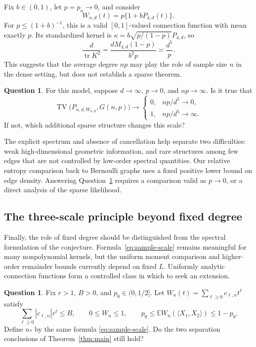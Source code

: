 \documentclass[11pt,reqno]{amsart}
\numberwithin{equation}{section}
\theoremstyle{definition}
\theoremstyle{remark}
\theoremstyle{definition}
\newtheorem{question}[theorem]{Question}
\DeclareMathOperator{\tr}{tr}
\DeclareMathOperator{\TV}{TV}
\begin{document}
Fix $b\in(0,1)$, let $p=p_n\to0$, and consider
\[
 W_{n,d}(t)=p\{1+bP_{4,d}(t)\}.
\]
For $p\le(1+b)^{-1}$, this is a valid $[0,1]$-valued connection function with mean exactly $p$.
Its standardized kernel is
$\kappa=b\sqrt{p/(1-p)}P_{4,d}$, so
\[
 \frac{d}{\tr K^2}
 =\frac{dM_{4,d}(1-p)}{b^2p}\asymp\frac{d^5}{p}.
\]
This suggests that the average degree $np$ may play the role of sample size $n$ in the dense setting, but does not establish a sparse theorem.

\begin{question}\label{q:sparse}
For this model, suppose $d\to\infty$, $p\to0$, and $np\to\infty$.
Is it true that
\[
 \TV\bigl(P_{n,d,W_{n,d}},G(n,p)\bigr)\longrightarrow
 \begin{cases}
 0,& np/d^5\longrightarrow0,\\[2pt]
 1,& np/d^5\longrightarrow\infty.
 \end{cases}
\]
If not, which additional sparse structure changes this scale?
\end{question}

The explicit spectrum and absence of cancellation help separate two difficulties:
weak high-dimensional geometric information, and rare structures among few edges that are not controlled by low-order spectral quantities.
Our relative entropy comparison back to Bernoulli graphs uses a fixed positive lower bound on edge density.
Answering Question~\ref{q:sparse} requires a comparison valid as $p\to0$, or a direct analysis of the sparse likelihood.

\subsection{The three-scale principle beyond fixed degree}
Finally, the role of fixed degree should be distinguished from the spectral formulation of the conjecture.
Formula~\eqref{eq:sample-scale} remains meaningful for many nonpolynomial kernels,
but the uniform moment comparison and higher-order remainder bounds currently depend on fixed $L$.
Uniformly analytic connection functions form a controlled class in which to seek an extension.

\begin{question}\label{q:analytic}
Fix $r>1$, $B>0$, and $p_0\in(0,1/2]$.
Let $W_n(t)=\sum_{\ell\ge0}c_{\ell,n}t^\ell$ satisfy
\[
 \sum_{\ell\ge0}|c_{\ell,n}|r^\ell\le B,\qquad
 0\le W_n\le1,\qquad p_0\le\mathbb EW_n(\langle X_1,X_2\rangle)\le1-p_0.
\]
Define $n_*$ by the same formula \eqref{eq:sample-scale}.
Do the two separation conclusions of Theorem~\ref{thm:main} still hold?
\end{question}
\end{document}
